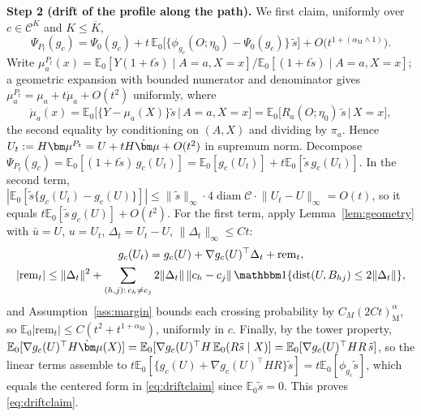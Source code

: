 \documentclass[11pt]{article}
\newcommand{\E}{\mathbb E}
\newcommand{\ind}[1]{\mathbbm 1\{#1\}}
\newcommand{\dist}{\operatorname{dist}}
\newcommand{\diam}{\operatorname{diam}}
\newcommand{\calC}{\mathcal C}
\newcommand{\bmu}{\bm\mu}
\newcommand{\norm}[1]{\lVert #1\rVert}
\newcommand{\given}{\,\big|\,}
\newcommand{\am}{\alpha_{\mathrm M}}
\begin{document}
\textbf{Step 2 (drift of the profile along the path).}
We first claim, uniformly over $c\in\calC^K$ and $K\le\overline K$,
\begin{equation}\label{eq:driftclaim}
\Psi_{P_t}(g_c)
=\Psi_0(g_c)+t\,\E_0\bigl[\{\phi_{g_c}(O;\eta_0)-\Psi_0(g_c)\}\,\tilde s\bigr]
+O\bigl(t^{1+(\am\wedge1)}\bigr).
\end{equation}
Write $\mu^{P_t}_a(x)=\E_0[Y(1+t\tilde s)\mid A=a,X=x]/\E_0[(1+t\tilde s)\mid A=a,X=x]$; a geometric expansion with bounded numerator and denominator gives $\mu^{P_t}_a=\mu_a+t\dot\mu_a+O(t^2)$ uniformly, where
\begin{equation*}
\dot\mu_a(x)=\E_0\bigl[\{Y-\mu_a(X)\}\tilde s\given A=a,X=x\bigr]
=\E_0\bigl[R_a(O;\eta_0)\,\tilde s\given X=x\bigr],
\end{equation*}
the second equality by conditioning on $(A,X)$ and dividing by $\pi_a$.  Hence $U_t:=H\bmu^{P_t}=U+tH\dot\bmu+O(t^2)$ in supremum norm.  Decompose $\Psi_{P_t}(g_c)=\E_0[(1+t\tilde s)\,g_c(U_t)]=\E_0[g_c(U_t)]+t\E_0[\tilde s\,g_c(U_t)]$.  In the second term, $|\E_0[\tilde s\{g_c(U_t)-g_c(U)\}]|\le\norm{\tilde s}_\infty\cdot4\diam\calC\cdot\norm{U_t-U}_\infty=O(t)$, so it equals $t\E_0[\tilde s\,g_c(U)]+O(t^2)$.  For the first term, apply Lemma~\ref{lem:geometry} with $\bar u=U$, $u=U_t$, $\Delta_t=U_t-U$, $\norm{\Delta_t}_\infty\le Ct$:
\begin{gather*}
g_c(U_t)=g_c(U)+\nabla g_c(U)^\top\Delta_t+\mathrm{rem}_t,\\
|\mathrm{rem}_t|\le\norm{\Delta_t}^2+\sum_{(h,j):\,c_h\ne c_j}2\norm{\Delta_t}\,\norm{c_h-c_j}\,\ind{\dist(U,B_{hj})\le2\norm{\Delta_t}},
\end{gather*}
and Assumption~\ref{ass:margin} bounds each crossing probability by $C_M(2Ct)^\am$, so $\E_0|\mathrm{rem}_t|\le C(t^2+t^{1+\am})$, uniformly in $c$.  Finally, by the tower property,
$\E_0[\nabla g_c(U)^\top H\dot\bmu(X)]=\E_0[\nabla g_c(U)^\top H\,\E_0(R\tilde s\mid X)]=\E_0[\nabla g_c(U)^\top HR\,\tilde s]$,
so the linear terms assemble to $t\E_0[\{g_c(U)+\nabla g_c(U)^\top HR\}\tilde s]=t\E_0[\phi_{g_c}\tilde s]$, which equals the centered form in \eqref{eq:driftclaim} since $\E_0\tilde s=0$.  This proves \eqref{eq:driftclaim}.
\end{document}
